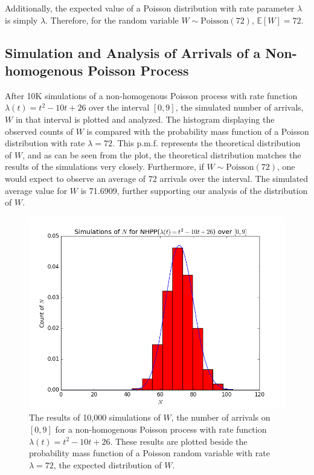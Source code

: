 \documentclass[11pt, oneside]{article}   	%
\begin{document}
Additionally, the expected value of a Poisson distribution with rate parameter $\lambda$ is simply $\lambda$. Therefore, for the random variable $W \sim \text{Poisson}(72)$, $\mathbb{E}[W]=72$.

\subsection{Simulation and Analysis of Arrivals of a Non-homogenous Poisson Process}
After 10K simulations of a non-homogenous Poisson process with rate function $\lambda(t) =t^2-10t+26$ over the interval $[0,9]$, the simulated number of arrivals, $W$ in that interval is plotted and analyzed. The histogram displaying the observed counts of $W$ is compared with the probability mass function of a Poisson distribution with rate $\lambda = 72$. This p.m.f. represents the theoretical distribution of $W$, and as can be seen from the plot, the theoretical distribution matches the results of the simulations very closely. Furthermore, if $W \sim \text{Poisson}(72)$, one would expect to observe an average of 72 arrivals over the interval. The simulated average value for $W$ is 71.6909, further supporting our analysis of the distribution of $W$.
\begin{figure}[H]
\includegraphics[scale=.5]{nhpp_n}
\caption{The results of 10,000 simulations of $W$, the number of arrivals on $[0,9]$ for a non-homogenous Poisson process with rate function $\lambda(t)=t^2-10t+26$. These results are plotted beside the probability mass function of a Poisson random variable with rate $\lambda=72$, the expected distribution of $W$.}
\label{fig:x}
\end{figure}
\end{document}
